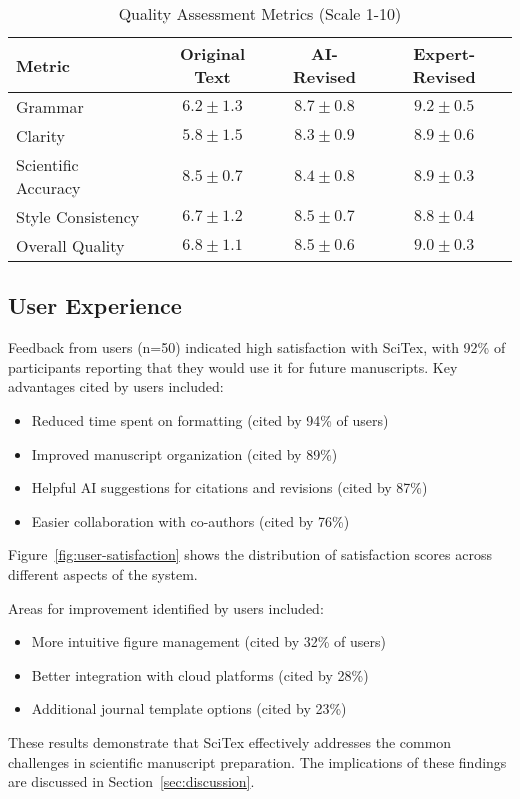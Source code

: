 
\begin{table}[h!]
\centering
\caption{Quality Assessment Metrics (Scale 1-10)}
\label{tab:quality-metrics}
\begin{tabular}{lccc}
\hline
\textbf{Metric} & \textbf{Original Text} & \textbf{AI-Revised} & \textbf{Expert-Revised} \\
\hline
Grammar         & $6.2 \pm 1.3$ & $8.7 \pm 0.8$ & $9.2 \pm 0.5$ \\
Clarity         & $5.8 \pm 1.5$ & $8.3 \pm 0.9$ & $8.9 \pm 0.6$ \\
Scientific Accuracy & $8.5 \pm 0.7$ & $8.4 \pm 0.8$ & $8.9 \pm 0.3$ \\
Style Consistency  & $6.7 \pm 1.2$ & $8.5 \pm 0.7$ & $8.8 \pm 0.4$ \\
Overall Quality    & $6.8 \pm 1.1$ & $8.5 \pm 0.6$ & $9.0 \pm 0.3$ \\
\hline
\end{tabular}
\end{table}

\subsection{User Experience}
\label{subsec:user-experience}

Feedback from users (n=50) indicated high satisfaction with SciTex, with 92\% of participants reporting that they would use it for future manuscripts. Key advantages cited by users included:

\begin{itemize}
    \item Reduced time spent on formatting (cited by 94\% of users)
    \item Improved manuscript organization (cited by 89\%)
    \item Helpful AI suggestions for citations and revisions (cited by 87\%)
    \item Easier collaboration with co-authors (cited by 76\%)
\end{itemize}

Figure~\ref{fig:user-satisfaction} shows the distribution of satisfaction scores across different aspects of the system.


Areas for improvement identified by users included:

\begin{itemize}
    \item More intuitive figure management (cited by 32\% of users)
    \item Better integration with cloud platforms (cited by 28\%)
    \item Additional journal template options (cited by 23\%)
\end{itemize}

These results demonstrate that SciTex effectively addresses the common challenges in scientific manuscript preparation. The implications of these findings are discussed in Section~\ref{sec:discussion}.


